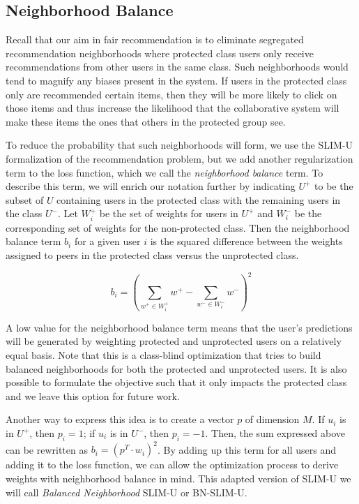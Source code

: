 \subsection{Neighborhood Balance}

Recall that our aim in fair recommendation is to eliminate segregated recommendation neighborhoods where protected class users only receive recommendations from other users in the same class. Such neighborhoods would tend to magnify any biases present in the system. If users in the protected class only are recommended certain items, then they will be more likely to click on those items and thus increase the likelihood that the collaborative system will make these items the ones that others in the protected group see.

To reduce the probability that such neighborhoods will form, we use the SLIM-U formalization of the recommendation problem, but we add another regularization term to the loss function, which we call the \textit{neighborhood balance} term. To describe this term, we will enrich our notation further by indicating $U^+$ to be the subset of $U$ containing users in the protected class with the remaining users in the class $U^-$. Let $W_i^+$ be the set of weights for users in $U^+$ and $W_i^-$ be the corresponding set of weights for the non-protected class. Then the neighborhood balance term $b_i$ for a given user $i$ is the squared difference between the weights assigned to peers in the protected class versus the unprotected class.

\begin{equation}
    b_i = (\sum_{w^+ \in W_i^+}{w^+} - \sum_{w^- \in W_i^-}{w^-})^2
\end{equation}

A low value for the neighborhood balance term means that the user's predictions will be generated by weighting protected and unprotected users on a relatively equal basis. Note that this is a class-blind optimization that tries to build balanced neighborhoods for both the protected and unprotected users. It is also possible to formulate the objective such that it only impacts the protected class and we leave this option for future work.

Another way to express this idea is to create a vector $p$ of dimension $M$. If $u_i$ is in $U^+$, then $p_i = 1$; if $u_i$ is in $U^-$, then $p_i = -1$. Then, the sum expressed above can be rewritten as $b_i = (p^T \cdot w_i)^2$. By adding up this term for all users and adding it to the loss function, we can allow the optimization process to derive weights with neighborhood balance in mind. This adapted version of SLIM-U we will call \textit{Balanced Neighborhood} SLIM-U or BN-SLIM-U.

